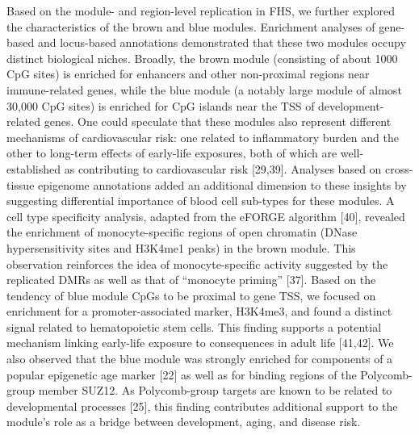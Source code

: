 \documentclass[]{article}
\theoremstyle{definition}
\theoremstyle{definition}
\theoremstyle{definition}
\theoremstyle{remark}
\begin{document}
Based on the module- and region-level replication in FHS, we further
explored the characteristics of the brown and blue modules. Enrichment
analyses of gene-based and locus-based annotations demonstrated that
these two modules occupy distinct biological niches. Broadly, the brown
module (consisting of about 1000 CpG sites) is enriched for enhancers
and other non-proximal regions near immune-related genes, while the blue
module (a notably large module of almost 30,000 CpG sites) is enriched
for CpG islands near the TSS of development-related genes. One could
speculate that these modules also represent different mechanisms of
cardiovascular risk: one related to inflammatory burden and the other to
long-term effects of early-life exposures, both of which are
well-established as contributing to cardiovascular risk {[}29,39{]}.
Analyses based on cross-tissue epigenome annotations added an additional
dimension to these insights by suggesting differential importance of
blood cell sub-types for these modules. A cell type specificity
analysis, adapted from the eFORGE algorithm {[}40{]}, revealed the
enrichment of monocyte-specific regions of open chromatin (DNase
hypersensitivity sites and H3K4me1 peaks) in the brown module. This
observation reinforces the idea of monocyte-specific activity suggested
by the replicated DMRs as well as that of ``monocyte priming'' {[}37{]}.
Based on the tendency of blue module CpGs to be proximal to gene TSS, we
focused on enrichment for a promoter-associated marker, H3K4me3, and
found a distinct signal related to hematopoietic stem cells. This
finding supports a potential mechanism linking early-life exposure to
consequences in adult life {[}41,42{]}. We also observed that the blue
module was strongly enriched for components of a popular epigenetic age
marker {[}22{]} as well as for binding regions of the Polycomb-group
member SUZ12. As Polycomb-group targets are known to be related to
developmental processes {[}25{]}, this finding contributes additional
support to the module's role as a bridge between development, aging, and
disease risk.
\end{document}
